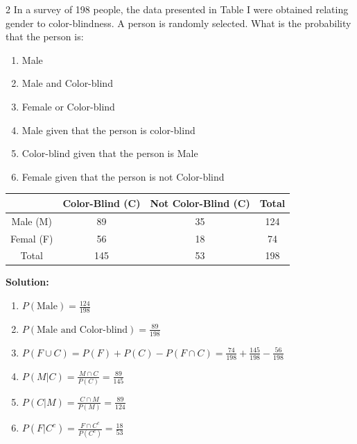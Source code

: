 \begin{multicols}{2}
\columnbreak
In a survey of 198 people, the data presented in Table I were obtained relating gender to color-blindness. A person is randomly selected. What is the probability that the person is:
\begin{enumerate}[leftmargin=*, label=$(\roman*)$]
   \item Male
   \item Male and Color-blind
   \item Female or Color-blind
   \item Male given that the person is color-blind
   \item Color-blind given that the person is Male
   \item Female given that the person is not Color-blind
\end{enumerate}

\begin{table}[H]
   \centering
   \begin{tabular}{|c|c|c|c|}\hline
      & Color-Blind (C) & Not Color-Blind (C) & Total \\\hline
      Male (M)  & 89 & 35 & 124 \\\hline
      Femal (F) & 56 & 18 & 74 \\\hline
      Total & 145 & 53 & 198 \\\hline
   \end{tabular}
\end{table}


\textbf{Solution:}
\begin{enumerate}[leftmargin=*, label=$(\roman*)$, itemsep=1em]
   \item $P(\text{Male}) = \frac{124}{198}$
   \item $P(\text{Male and Color-blind}) = \frac{89}{198}$
   \item $P(F \cup C) = P(F) + P(C) - P(F\cap C) = \frac{74}{198}+\frac{145}{198} - \frac{56}{198}$
   \item $P(M|C) = \frac{M \cap C}{P(C)} = \frac{89}{145}$
   \item $P(C|M) = \frac{C \cap M}{P(M)} = \frac{89}{124}$
   \item $P(F|C^c) = \frac{F \cap C^c}{P(C^c)} = \frac{18}{53}$
\end{enumerate}


\begin{center}
\end{center}
\end{multicols}
